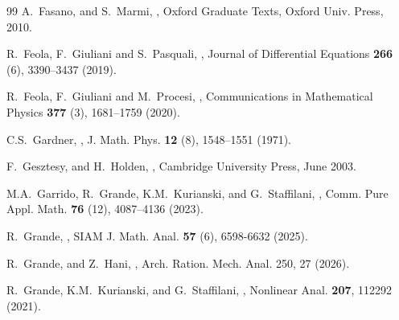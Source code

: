 \documentclass[a4paper,10pt,reqno]{article}
\theoremstyle{definition}
\theoremstyle{plain}
\theoremstyle{plain}
\theoremstyle{definition}
\theoremstyle{plain}
\theoremstyle{plain}
\theoremstyle{plain}
\theoremstyle{definition}
\theoremstyle{definition}
\begin{document}
{\begin{thebibliography}{99}
{\sc A.~Fasano, and S.~Marmi},
,
\newblock Oxford Graduate Texts, Oxford Univ. Press, 2010.

{\sc R.~Feola, F.~Giuliani and S.~Pasquali},
,
\newblock Journal of Differential Equations {\bf 266} (6), 3390--3437 (2019).

{\sc R.~Feola, F.~Giuliani and M.~Procesi},
,
\newblock Communications in Mathematical Physics {\bf 377} (3), 1681--1759 (2020).


{\sc C.S.~Gardner},
,
\newblock J. Math. Phys. {\bf 12} (8), 1548--1551 (1971).

{\sc F.~Gesztesy, and H.~Holden},
,
\newblock Cambridge University Press, June 2003.

{\sc M.A.~Garrido, R.~Grande, K.M.~Kurianski, and G.~Staffilani},
,
\newblock Comm. Pure Appl. Math. {\bf 76} (12), 4087--4136 (2023).

{\sc R.~Grande}, 
, SIAM J. Math. Anal. {\bf 57} (6), 6598-6632 (2025).

{\sc R.~Grande, and Z.~Hani}, 
, Arch. Ration. Mech. Anal. 250, 27 (2026).

{\sc R.~Grande, K.M.~Kurianski, and G.~Staffilani}, 
, Nonlinear Anal. {\bf 207}, 112292 (2021).



\end{thebibliography}}
\end{document}

